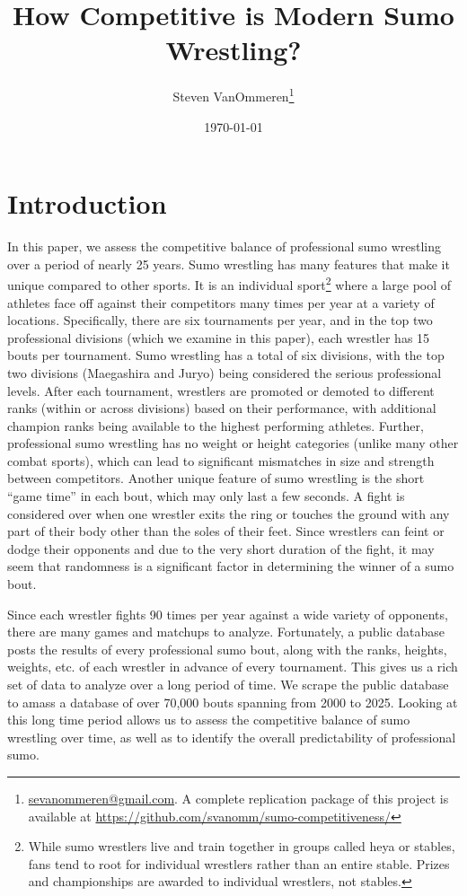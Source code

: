 \documentclass[12pt]{article}
\begin{document}
\title{How Competitive is Modern Sumo Wrestling?}
\author{Steven VanOmmeren\thanks{\href{mailto:sevanommeren@gmail.com}{sevanommeren@gmail.com}. A complete replication package of this project is available at \url{https://github.com/svanomm/sumo-competitiveness/}}}
\date{\today}
\maketitle

\doublespacing
\section{Introduction}

In this paper, we assess the competitive balance of professional sumo wrestling over a period of nearly 25 years. Sumo wrestling has many features that make it unique compared to other sports. It is an individual sport\footnote{While sumo wrestlers live and train together in groups called heya or stables, fans tend to root for individual wrestlers rather than an entire stable. Prizes and championships are awarded to individual wrestlers, not stables.} where a large pool of athletes face off against their competitors many times per year at a variety of locations. Specifically, there are six tournaments per year, and in the top two professional divisions (which we examine in this paper), each wrestler has 15 bouts per tournament. Sumo wrestling has a total of six divisions, with the top two divisions (Maegashira and Juryo) being considered the serious professional levels. After each tournament, wrestlers are promoted or demoted to different ranks (within or across divisions) based on their performance, with additional champion ranks being available to the highest performing athletes. Further, professional sumo wrestling has no weight or height categories (unlike many other combat sports), which can lead to significant mismatches in size and strength between competitors. Another unique feature of sumo wrestling is the short ``game time'' in each bout, which may only last a few seconds. A fight is considered over when one wrestler exits the ring or touches the ground with any part of their body other than the soles of their feet. Since wrestlers can feint or dodge their opponents and due to the very short duration of the fight, it may seem that randomness is a significant factor in determining the winner of a sumo bout.

Since each wrestler fights 90 times per year against a wide variety of opponents, there are many games and matchups to analyze. Fortunately, a public database posts the results of every professional sumo bout, along with the ranks, heights, weights, etc. of each wrestler in advance of every tournament. This gives us a rich set of data to analyze over a long period of time. We scrape the public database to amass a database of over 70,000 bouts spanning from 2000 to 2025. Looking at this long time period allows us to assess the competitive balance of sumo wrestling over time, as well as to identify the overall predictability of professional sumo.
\end{document}
